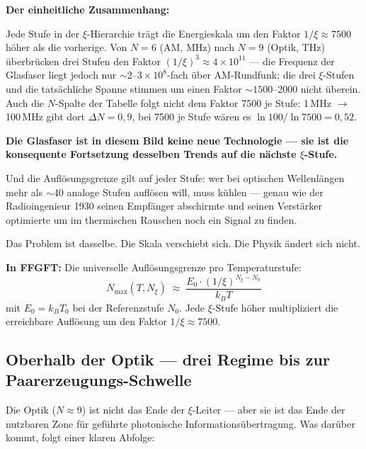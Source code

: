 \begin{foundation}
\medskip
\textbf{Der einheitliche Zusammenhang:}

Jede Stufe in der $\xi$-Hierarchie trägt die Energieskala
um den Faktor $1/\xi \approx 7500$ höher als die vorherige.
Von $N = 6$ (AM, MHz) nach $N = 9$ (Optik, THz)
überbrücken drei Stufen den Faktor
$(1/\xi)^3 \approx 4 \times 10^{11}$ ---
die Frequenz der Glasfaser liegt jedoch nur
$\sim 2$--$3\times10^8$-fach über AM-Rundfunk; die drei
$\xi$-Stufen und die tatsächliche Spanne stimmen um einen Faktor
$\sim 1500$--$2000$ nicht überein.
Auch die $N$-Spalte der Tabelle folgt nicht dem Faktor 7500 je Stufe:
1\,MHz $\to$ 100\,MHz gibt dort $\Delta N = 0{,}9$, bei 7500 je Stufe
wären es $\ln 100/\ln 7500 = 0{,}52$.

\textbf{Die Glasfaser ist in diesem Bild keine neue Technologie ---
sie ist die konsequente Fortsetzung desselben Trends
auf die nächste $\xi$-Stufe.}

Und die Auflösungsgrenze gilt auf jeder Stufe:
wer bei optischen Wellenlängen mehr als $\sim$40 analoge
Stufen auflösen will, muss kühlen ---
genau wie der Radioingenieur 1930 seinen Empfänger
abschirmte und seinen Verstärker optimierte um
im thermischen Rauschen noch ein Signal zu finden.

Das Problem ist dasselbe. Die Skala verschiebt sich.
Die Physik ändert sich nicht.

\textbf{In FFGFT:}
Die universelle Auflösungsgrenze pro Temperaturstufe:
\begin{equation}
  \boxed{N_\text{max}(T, N_\xi)
  \;\approx\;
  \frac{E_0 \cdot (1/\xi)^{N_\xi - N_0}}{k_B T}}
\end{equation}
mit $E_0 = k_B T_0$ bei der Referenzstufe $N_0$.
Jede $\xi$-Stufe höher multipliziert die
erreichbare Auflösung um den Faktor $1/\xi \approx 7500$.
\end{foundation}

\subsection{Oberhalb der Optik --- drei Regime bis zur Paarerzeugungs-Schwelle}
\label{sec:oberhalb-optik}

Die Optik ($N \approx 9$) ist nicht das Ende der $\xi$-Leiter ---
aber sie ist das Ende der nutzbaren Zone für
geführte photonische Informationsübertragung.
Was darüber kommt, folgt einer klaren Abfolge:

